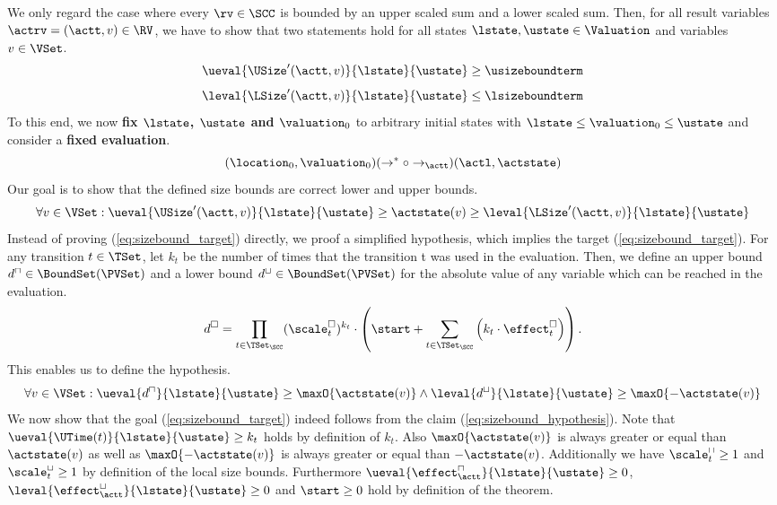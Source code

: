 We only regard the case where every $\rv \in \SCC$ is bounded by an upper scaled sum and a lower scaled sum.
Then, for all result variables $\actrv = (\actt, v) \in \RV$, we have to show that two statements hold for all states $\lstate, \ustate \in \Valuation$ and variables $v \in \VSet$.
\[ \ueval{\USize'(\actt, v)}{\lstate}{\ustate} \geq \usizeboundterm \]
\[ \leval{\LSize'(\actt, v)}{\lstate}{\ustate} \leq \lsizeboundterm \]
To this end, we now \textbf{fix $\lstate$, $\ustate$ and $\valuation_0$} to arbitrary initial states with $\lstate \leq \valuation_0 \leq \ustate$ and consider a \textbf{fixed evaluation}.
\[ (\location_0, \valuation_0) (\rightarrow^* \circ \rightarrow_\actt) (\actl, \actstate) \]
Our goal is to show that the defined size bounds are correct lower and upper bounds.
\begin{equation} \label{eq:sizebound_target}
  \forall v \in \VSet: \ueval{\USize'(\actt, v)}{\lstate}{\ustate} \geq \actstate(v) \geq \leval{\LSize'(\actt, v)}{\lstate}{\ustate}
\end{equation}
Instead of proving (\ref{eq:sizebound_target}) directly, we proof a simplified hypothesis, which implies the target (\ref{eq:sizebound_target}).
For any transition $t \in \TSet$, let $k_t$ be the number of times that the transition t was used in the evaluation.
Then, we define an upper bound $d^\sqcap \in \BoundSet(\PVSet)$ and a lower bound $d^\sqcup \in \BoundSet(\PVSet)$ for the absolute value of any variable which can be reached in the evaluation.
\[ d^\square = \prod_{t \in \TSet_\SCC} (\scale^\square_t)^{k_t} \cdot \left( \start + \sum_{t \in \TSet_\SCC} \left( k_t \cdot \effect^\square_t \right) \right). \]
This enables us to define the hypothesis.
\begin{equation} \label{eq:sizebound_hypothesis}
  \forall v \in \VSet: \ueval{d^\sqcap}{\lstate}{\ustate} \geq \maxO{\actstate(v)} \wedge \leval{d^\sqcup}{\lstate}{\ustate} \geq \maxO{-\actstate(v)}
\end{equation}
We now show that the goal (\ref{eq:sizebound_target}) indeed follows from the claim (\ref{eq:sizebound_hypothesis}).
Note that $\ueval{\UTime(t)}{\lstate}{\ustate} \geq k_t$ holds by definition of $k_t$.
Also $\maxO{\actstate(v)}$ is always greater or equal than $\actstate(v)$ as well as $\maxO{-\actstate(v)}$ is always greater or equal than $-\actstate(v)$.
Additionally we have $\scale^\sqcap_t \geq 1$ and $\scale^\sqcup_t \geq 1$ by definition of the local size bounds.
Furthermore $\ueval{\effect^\sqcap_\actt}{\lstate}{\ustate} \geq 0$, $\leval{\effect^\sqcup_\actt}{\lstate}{\ustate} \geq 0$ and $\start \geq 0$ hold by definition of the theorem.

